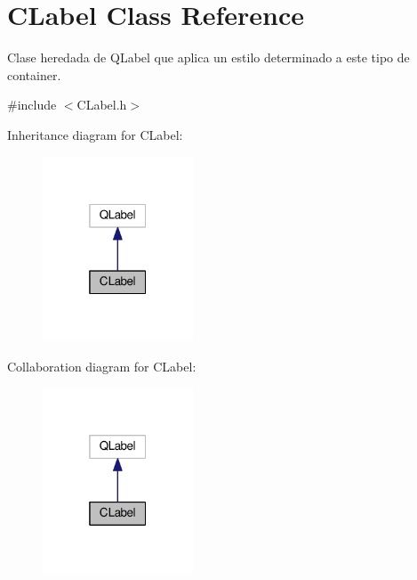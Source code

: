 \hypertarget{classCLabel}{}\section{C\+Label Class Reference}
\label{classCLabel}


Clase heredada de \textquotesingle{}Q\+Label\textquotesingle{} que aplica un estilo determinado a este tipo de container.  




{\ttfamily \#include $<$C\+Label.\+h$>$}



Inheritance diagram for C\+Label\+:
\nopagebreak
\begin{figure}[H]
\begin{center}
\leavevmode
\includegraphics[width=127pt]{classCLabel__inherit__graph}
\end{center}
\end{figure}


Collaboration diagram for C\+Label\+:
\nopagebreak
\begin{figure}[H]
\begin{center}
\leavevmode
\includegraphics[width=127pt]{classCLabel__coll__graph}
\end{center}
\end{figure}
